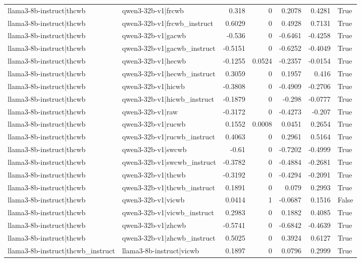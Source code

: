 \begin{table}
\begin{tabular}{l l r r r r l}
llama3-8b-instruct|thcwb & qwen3-32b-v1|frcwb & 0.318 & 0 & 0.2078 & 0.4281 & True \\
llama3-8b-instruct|thcwb & qwen3-32b-v1|frcwb_instruct & 0.6029 & 0 & 0.4928 & 0.7131 & True \\
llama3-8b-instruct|thcwb & qwen3-32b-v1|gacwb & -0.536 & 0 & -0.6461 & -0.4258 & True \\
llama3-8b-instruct|thcwb & qwen3-32b-v1|gacwb_instruct & -0.5151 & 0 & -0.6252 & -0.4049 & True \\
llama3-8b-instruct|thcwb & qwen3-32b-v1|hecwb & -0.1255 & 0.0524 & -0.2357 & -0.0154 & True \\
llama3-8b-instruct|thcwb & qwen3-32b-v1|hecwb_instruct & 0.3059 & 0 & 0.1957 & 0.416 & True \\
llama3-8b-instruct|thcwb & qwen3-32b-v1|hicwb & -0.3808 & 0 & -0.4909 & -0.2706 & True \\
llama3-8b-instruct|thcwb & qwen3-32b-v1|hicwb_instruct & -0.1879 & 0 & -0.298 & -0.0777 & True \\
llama3-8b-instruct|thcwb & qwen3-32b-v1|raw & -0.3172 & 0 & -0.4273 & -0.207 & True \\
llama3-8b-instruct|thcwb & qwen3-32b-v1|rucwb & 0.1552 & 0.0008 & 0.0451 & 0.2654 & True \\
llama3-8b-instruct|thcwb & qwen3-32b-v1|rucwb_instruct & 0.4063 & 0 & 0.2961 & 0.5164 & True \\
llama3-8b-instruct|thcwb & qwen3-32b-v1|swcwb & -0.61 & 0 & -0.7202 & -0.4999 & True \\
llama3-8b-instruct|thcwb & qwen3-32b-v1|swcwb_instruct & -0.3782 & 0 & -0.4884 & -0.2681 & True \\
llama3-8b-instruct|thcwb & qwen3-32b-v1|thcwb & -0.3192 & 0 & -0.4294 & -0.2091 & True \\
llama3-8b-instruct|thcwb & qwen3-32b-v1|thcwb_instruct & 0.1891 & 0 & 0.079 & 0.2993 & True \\
llama3-8b-instruct|thcwb & qwen3-32b-v1|vicwb & 0.0414 & 1 & -0.0687 & 0.1516 & False \\
llama3-8b-instruct|thcwb & qwen3-32b-v1|vicwb_instruct & 0.2983 & 0 & 0.1882 & 0.4085 & True \\
llama3-8b-instruct|thcwb & qwen3-32b-v1|zhcwb & -0.5741 & 0 & -0.6842 & -0.4639 & True \\
llama3-8b-instruct|thcwb & qwen3-32b-v1|zhcwb_instruct & 0.5025 & 0 & 0.3924 & 0.6127 & True \\
llama3-8b-instruct|thcwb_instruct & llama3-8b-instruct|vicwb & 0.1897 & 0 & 0.0796 & 0.2999 & True \\

\end{tabular}
\end{table}
